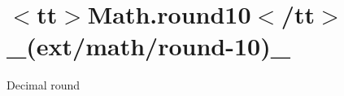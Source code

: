 \chapter{\texorpdfstring{$<$}{<}tt\texorpdfstring{$>$}{>}Math.\+round10\texorpdfstring{$<$}{<}/tt\texorpdfstring{$>$}{>} \+\_\+(ext/math/round-\/10)\+\_\+}
\hypertarget{md__2home_2solype_2delivery_2current__days_2Mannheim_2front_2node__modules_2ext_2docs_2math_2round-10}{}\label{md__2home_2solype_2delivery_2current__days_2Mannheim_2front_2node__modules_2ext_2docs_2math_2round-10}
\label{md__2home_2solype_2delivery_2current__days_2Mannheim_2front_2node__modules_2ext_2docs_2math_2round-10_autotoc_md2572}%
%
 Decimal round


\begin{DoxyCode}{0}
\DoxyCodeLine{}

\end{DoxyCode}
 